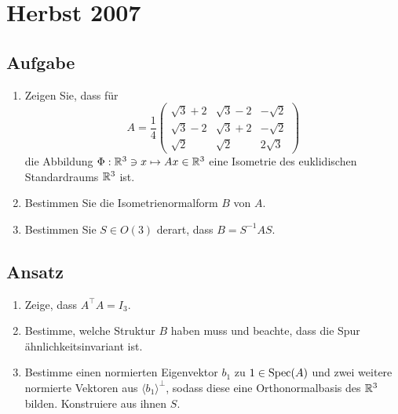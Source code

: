 \section{Herbst 2007}

\subsection{Aufgabe}
\begin{enumerate}
	\item Zeigen Sie, dass für
		\begin{equation*}
			A = \frac{1}{4}\begin{pmatrix}
				\sqrt{3}+2 & \sqrt{3}-2 & -\sqrt{2} \\
				\sqrt{3}-2 & \sqrt{3}+2 & -\sqrt{2} \\
				\sqrt{2} & \sqrt{2} & 2\sqrt{3}
			\end{pmatrix}
		\end{equation*}
		die Abbildung \( \Phi: \mathbb{R}^3 \ni x \mapsto Ax \in \mathbb{R}^3 \) eine Isometrie des euklidischen Standardraums \( \mathbb{R}^3 \) ist.
	\item Bestimmen Sie die Isometrienormalform \( B \) von \( A \).
	\item Bestimmen Sie \( S \in O(3) \) derart, dass \( B = S^{-1}AS \).
\end{enumerate}

\subsection{Ansatz}
\begin{enumerate}
	\item Zeige, dass \( A^\top A = I_3 \).
	\item Bestimme, welche Struktur \( B \) haben muss und beachte, dass die Spur ähnlichkeitsinvariant ist.
	\item Bestimme einen normierten Eigenvektor \( b_1 \) zu \( 1 \in \text{Spec}(A) \) und zwei weitere normierte Vektoren aus \( \langle b_1 \rangle^\perp \), sodass diese eine Orthonormalbasis des \( \mathbb{R}^3 \) bilden. Konstruiere aus ihnen \( S \).
\end{enumerate}

